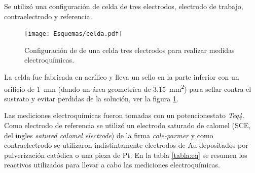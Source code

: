 	 Se utilizó una configuración de celda de tres electrodos, electrodo de trabajo, contraelectrodo y referencia. 
	 				\begin{figure}[!ht]
			 		  \begin{center}
			 		  \texttt{[image: Esquemas/celda.pdf]}
			 		  \caption[Configuración de una celda de tres electrodos]{Configuración de de una celda tres electrodos para realizar medidas electroquímicas.}
			 		  \label{fig:celda}
			 		  \end{center}
			 		  \end{figure}

	 La celda fue fabricada en acrílico y lleva un sello en la parte inferior con un orificio de \SI{1}{\mm} (dando un área geometríca de \SI{3.15}{\mm^{2}}) para sellar contra el sustrato y evitar perdidas de la solución, ver la figura \ref{fig:celda}. 
	
	 Las mediciones electroquímicas fueron tomadas con un potencionestato \textit{Teq4}. Como electrodo de referencia se utilizó un electrodo saturado de calomel (SCE, del ingles \textit{satured calomel electrode}) de la firma \textit{cole-parmer} y como contraelectrodo se utilizaron indistintamente electrodos de Au depositados por pulverización catódica o una pieza de Pt. En la tabla \ref{tabla:eq} se resumen los reactivos utilizados para llevar a cabo las mediciones electroquímicas. 

	 \newpage

